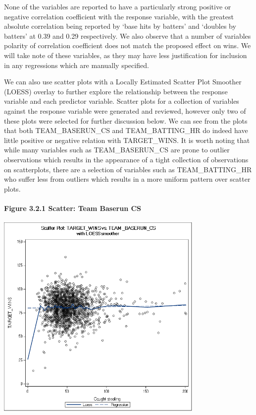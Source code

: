 \documentclass[]{article}
\let\oldparagraph\paragraph
\renewcommand{\paragraph}[1]{\oldparagraph{#1}\mbox{}}
\begin{document}
None of the variables are reported to have a particularly strong
positive or negative correlation coefficient with the response variable,
with the greatest absolute correlation being reported by `base hits by
batters' and `doubles by batters' at 0.39 and 0.29 respectively. We also
observe that a number of variables polarity of correlation coefficient
does not match the proposed effect on wins. We will take note of these
variables, as they may have less justification for inclusion in any
regressions which are manually specified.

We can also use scatter plots with a Locally Estimated Scatter Plot
Smoother (LOESS) overlay to further explore the relationship between the
response variable and each predictor variable. Scatter plots for a
collection of variables against the response variable were generated and
reviewed, however only two of these plots were selected for further
discussion below. We can see from the plots that both TEAM\_BASERUN\_CS
and TEAM\_BATTING\_HR do indeed have little positive or negative
relation with TARGET\_WINS. It is worth noting that while many variables
such as TEAM\_BASERUN\_CS are prone to outlier observations which
results in the appearance of a tight collection of observations on
scatterplots, there are a selection of variables such as
TEAM\_BATTING\_HR who suffer less from outliers which results in a more
uniform pattern over scatter plots.

\newpage

\paragraph{Figure 3.2.1 Scatter: Team Baserun
CS}\label{figure-3.2.1-scatter-team-baserun-cs}

\includegraphics[height=3.95833in]{images/scatter_team_baserun_cs.png}
\end{document}
